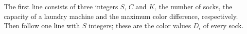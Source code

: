 The first line consists of three integers $S$, $C$ and $K$, the number of socks, 
the capacity of a laundry machine and the maximum color difference, respectively. 
Then follow one line with $S$ integers; these are the color values $D_i$ of every sock.
